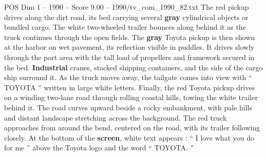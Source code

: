 \begin{textsample}{POS Dim 1 – 1990 – Score 9.00 – 1990/tv\_com\_1990\_82.txt}
The red pickup drives along the dirt road, its bed carrying several \textbf{gray} cylindrical objects or bundled cargo.
The white two-wheeled trailer bounces along behind it as the truck continues through the open fields.
The \textbf{gray} Toyota pickup is then shown at the harbor on wet pavement, its reflection visible in puddles.
It drives slowly through the port area with the tall load of propellers and framework secured in the bed. \textbf{Industrial} cranes, stacked shipping containers, and the side of the cargo ship surround it.
As the truck moves away, the tailgate comes into view with “ TOYOTA ” written in large white letters.
Finally, the red Toyota pickup drives on a winding two-lane road through rolling coastal hills, towing the white trailer behind it.
The road curves upward beside a rocky embankment, with pale hills and distant landscape stretching across the background.
The red truck approaches from around the bend, centered on the road, with its trailer following closely.
At the bottom of the \textbf{screen}, white text appears : “ I love what you do for me ” above the Toyota logo and the word “ TOYOTA. ”

\end{textsample}

